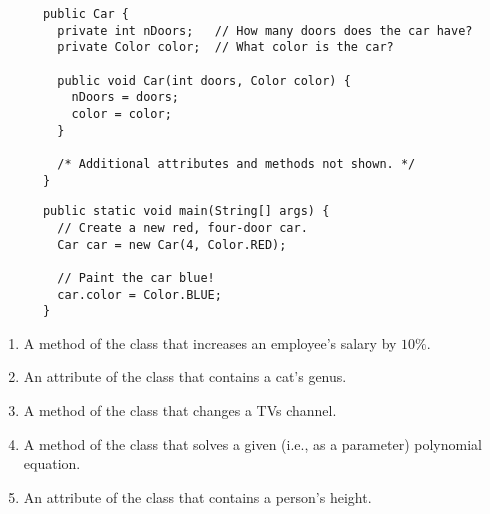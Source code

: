 

\def\AssignmentCourse{AP Computer Science A}
\def\AssignmentNumber{07}
\def\AssignmentTitle{Classes \& Objects}


  \begin{questions}
    \begin{lstlisting}
      public Car {
        private int nDoors;   // How many doors does the car have?
        private Color color;  // What color is the car?

        public void Car(int doors, Color color) {
          nDoors = doors;
          color = color;
        }

        /* Additional attributes and methods not shown. */
      }
    \end{lstlisting}

    \begin{lstlisting}
      public static void main(String[] args) {
        // Create a new red, four-door car.
        Car car = new Car(4, Color.RED);

        // Paint the car blue!
        car.color = Color.BLUE;
      }
    \end{lstlisting}


    \begin{enumerate}[label=\texttt{\alph*.}]
      \item A method of the  class that increases an employee's salary by $10\%$.
      \item An attribute of the  class that contains a cat's genus.
      \item A method of the  class that changes a TVs channel.
      \item A method of the  class that solves a given (i.e., as a parameter) polynomial equation.
      \item An attribute of the  class that contains a person's height.
    \end{enumerate}


\end{questions}
